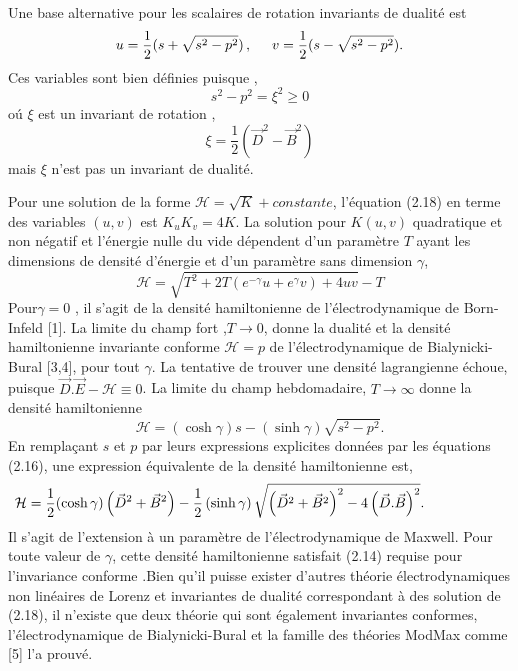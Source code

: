\documentclass[12pt,a4paper, openany]{report}
\begin{document}
	Une base alternative pour les scalaires de rotation invariants de dualité est 
	\begin{equation}
		u=\frac{1}{2}(s+\sqrt{s^2-p^2})\, ,\hspace{0.5cm} v=\frac{1}{2}(s-\sqrt{s^2-p^2}).
	\end{equation} 
	Ces variables sont bien définies puisque ,
	\begin{equation}
		s^2-p^2=\xi^{2}\geq 0
	\end{equation}
	o\'{u} $\xi$ est un invariant de rotation ,
	\begin{equation}
		\xi=\frac{1}{2}(\vec{D}^{2}-\vec{B}^{2})
	\end{equation}
	mais $\xi$ n'est pas un invariant de dualité.
	\par Pour une solution de la forme $\mathcal{H}=\sqrt{K}+constante$, l'équation (2.18) en terme des variables $(u,v)$ est $K_uK_v=4K$. La solution pour $K(u,v)$ quadratique et non négatif et l'énergie nulle du vide dépendent d'un paramètre $T$ ayant les dimensions de densité d'énergie et d'un paramètre sans dimension $\gamma$,
	\begin{equation}
		\mathcal{H}=\sqrt{T^{2}+2T(e^{-\gamma}u+e^{\gamma}v)+4uv}-T
	\end{equation}
	Pour$\gamma =0$ , il s'agit de la densité hamiltonienne de l'électrodynamique de Born-Infeld [1]. La limite du champ fort ,$T\rightarrow{0}$, donne la dualité et la densité hamiltonienne invariante conforme $\mathcal{H} =p$ de l'électrodynamique de Bialynicki-Bural [3,4], pour tout $\gamma$. La tentative de trouver une densité lagrangienne échoue, puisque $\vec{D}.\vec{E}-\mathcal{H}\equiv0$. La limite du champ hebdomadaire, $T\rightarrow{\infty}$ donne la densité hamiltonienne 
	\begin{equation}
		\mathcal{H}=(\cosh{\gamma})s-(\sinh{\gamma})\sqrt{s^2-p^2} .
	\end{equation}
	En remplaçant $s$ et $p$ par leurs expressions explicites données par les équations (2.16), une expression équivalente de la densité hamiltonienne est,
	\begin{equation}                                                          \hspace{-2cm}\mathcal{H}=\frac{1}{2}(\cosh{\gamma})\left(\vec{D}^{2}+\vec{B}^{2}\right)-\frac{1}{2}\left(\sinh{\gamma}\right)\sqrt{\left(\vec{D}^{2}+\vec{B}^{2}\right)^{2}-4\left(\vec{D}.\vec{B}\right)^{2}} .
	\end{equation}
	Il s'agit de l'extension à un paramètre de l'électrodynamique de Maxwell. Pour toute valeur de $\gamma$, cette densité hamiltonienne satisfait (2.14) requise pour l'invariance conforme .Bien qu'il  puisse exister d'autres théorie électrodynamiques non linéaires de Lorenz et invariantes de dualité correspondant à des solution de (2.18), il n'existe que deux théorie qui sont également invariantes conformes, l'électrodynamique de Bialynicki-Bural et la famille des théories ModMax comme [5] l'a prouvé.
\end{document}
